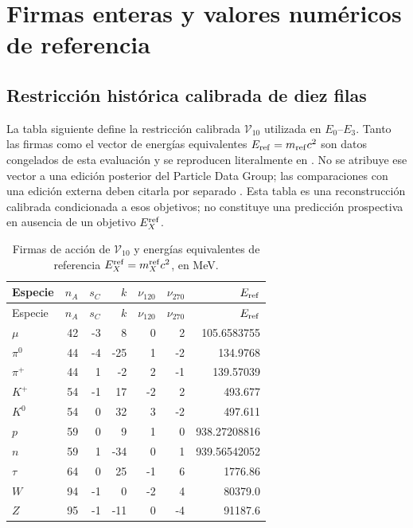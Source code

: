\chapter{Firmas enteras y valores numéricos de referencia}
\label{app:tablas}

\section{Restricción histórica calibrada de diez filas}

La tabla siguiente define la restricción calibrada \(\mathcal V_{10}\) utilizada
en \(E_0\)--\(E_3\). Tanto las firmas como el vector de energías equivalentes
\(E_{\rm ref}=m_{\rm ref}c^2\) son datos congelados de esta evaluación y se
reproducen literalmente en
. No se atribuye ese vector a una
edición posterior del Particle Data Group; las comparaciones con una edición
externa deben citarla por separado \cite{PDG2024}.
Esta tabla es una reconstrucción calibrada condicionada a esos objetivos; no
constituye una predicción prospectiva en ausencia de un objetivo
\(E_X^{\rm ref}\).

\begin{longtable}{@{}lrrrrrr@{}}
\caption[Firmas y energías equivalentes de referencia]{Firmas de acción de
\(\mathcal V_{10}\) y energías equivalentes de
referencia \(E_X^{\rm ref}=m_X^{\rm ref}c^2\), en MeV.}
\label{tab:firmas-diez}\\
\toprule
Especie & \(n_A\)&\(s_C\)&\(k\)&\(\nu_{120}\)&\(\nu_{270}\)&\(E_{\rm ref}\)\\
\midrule
\endfirsthead
\toprule
Especie & \(n_A\)&\(s_C\)&\(k\)&\(\nu_{120}\)&\(\nu_{270}\)&\(E_{\rm ref}\)\\
\midrule
\endhead
\(\mu\)&42&-3&8&0&2&105.6583755\\
\(\pi^0\)&44&-4&-25&1&-2&134.9768\\
\(\pi^+\)&44&1&-2&2&-1&139.57039\\
\(K^+\)&54&-1&17&-2&2&493.677\\
\(K^0\)&54&0&32&3&-2&497.611\\
\(p\)&59&0&9&1&0&938.27208816\\
\(n\)&59&1&-34&0&1&939.56542052\\
\(\tau\)&64&0&25&-1&6&1776.86\\
\(W\)&94&-1&0&-2&4&80379.0\\
\(Z\)&95&-1&-11&0&-4&91187.6\\
\bottomrule
\end{longtable}

